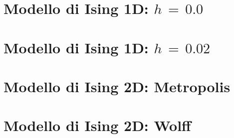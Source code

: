 \appendix 


\section{Modello di Ising 1D: $h\,=\,0.0$}


\section{Modello di Ising 1D: $h\,=\,0.02$}




\section{Modello di Ising 2D: Metropolis}


\section{Modello di Ising 2D: Wolff}
